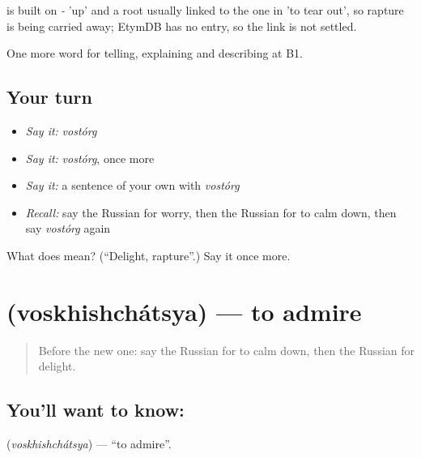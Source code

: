 \begin{cousinweb}
\emph{} is built on \emph{-} 'up' and a root usually linked to the one in \emph{} 'to tear out', so rapture is being carried away; EtymDB has no entry, so the link is not settled.
\end{cousinweb}

\begin{grammarlens}[title={What you've built}]
One more word for telling, explaining and describing at B1.
\end{grammarlens}

\subsection*{Your turn}
\begin{itemize}
\raggedright
  \item \emph{Say it:} \emph{vostórg}
  \item \emph{Say it:} \emph{vostórg}, once more
  \item \emph{Say it:} a sentence of your own with \emph{vostórg}
  \item \emph{Recall:} say the Russian for worry, then the Russian for to calm down, then say \emph{vostórg} again
\end{itemize}

\begin{tcolorbox}[breakable,colback=teal!4,colframe=teal!35!black,title={Before you move on}]
What does  mean? (\textquotedblleft{}Delight, rapture\textquotedblright{}.) Say it once more.
\end{tcolorbox}
\section[\texorpdfstring{\ru{восхищаться} (voskhishchátsya)}{восхищаться (voskhishchátsya)}]{ (voskhishchátsya) — to admire}

\label{lesson:RU-C475-voskhishchatsya}



\begin{quote}
Before the new one: say the Russian for to calm down, then the Russian for delight.
\end{quote}

\subsection*{You'll want to know: }
\textbf{} (\emph{voskhishchátsya}) — \textquotedblleft{}to admire\textquotedblright{}.

